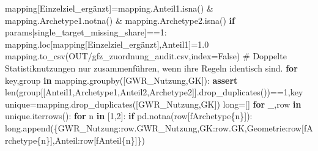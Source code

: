 \documentclass[
  ngerman,
  a4paper,
  DIV=11]{scrreprt}
\newenvironment{Shaded}{\begin{snugshade}}{\end{snugshade}}
\newcommand{\BuiltInTok}[1]{\textcolor[rgb]{0.00,0.23,0.31}{#1}}
\newcommand{\CommentTok}[1]{\textcolor[rgb]{0.37,0.37,0.37}{#1}}
\newcommand{\ControlFlowTok}[1]{\textcolor[rgb]{0.00,0.23,0.31}{\textbf{#1}}}
\newcommand{\DecValTok}[1]{\textcolor[rgb]{0.68,0.00,0.00}{#1}}
\newcommand{\FloatTok}[1]{\textcolor[rgb]{0.68,0.00,0.00}{#1}}
\newcommand{\KeywordTok}[1]{\textcolor[rgb]{0.00,0.23,0.31}{\textbf{#1}}}
\newcommand{\NormalTok}[1]{\textcolor[rgb]{0.00,0.23,0.31}{#1}}
\newcommand{\OperatorTok}[1]{\textcolor[rgb]{0.37,0.37,0.37}{#1}}
\newcommand{\SpecialCharTok}[1]{\textcolor[rgb]{0.37,0.37,0.37}{#1}}
\newcommand{\SpecialStringTok}[1]{\textcolor[rgb]{0.13,0.47,0.30}{#1}}
\newcommand{\StringTok}[1]{\textcolor[rgb]{0.13,0.47,0.30}{#1}}
\newcommand{\VariableTok}[1]{\textcolor[rgb]{0.07,0.07,0.07}{#1}}
\begin{document}
\begin{Shaded}
\begin{Highlighting}[]
\NormalTok{mapping[}\StringTok{\textquotesingle{}Einzelziel\_ergänzt\textquotesingle{}}\NormalTok{]}\OperatorTok{=}\NormalTok{mapping.Anteil1.isna() }\OperatorTok{\&}\NormalTok{ mapping.Archetype1.notna() }\OperatorTok{\&}\NormalTok{ mapping.Archetype2.isna()}
\ControlFlowTok{if}\NormalTok{ params[}\StringTok{\textquotesingle{}single\_target\_missing\_share\textquotesingle{}}\NormalTok{]}\OperatorTok{==}\DecValTok{1}\NormalTok{:}
\NormalTok{    mapping.loc[mapping[}\StringTok{\textquotesingle{}Einzelziel\_ergänzt\textquotesingle{}}\NormalTok{],}\StringTok{\textquotesingle{}Anteil1\textquotesingle{}}\NormalTok{]}\OperatorTok{=}\FloatTok{1.0}
\NormalTok{mapping.to\_csv(OUT}\OperatorTok{/}\StringTok{\textquotesingle{}gfz\_zuordnung\_audit.csv\textquotesingle{}}\NormalTok{,index}\OperatorTok{=}\VariableTok{False}\NormalTok{)}
\CommentTok{\# Doppelte Statistiknutzungen nur zusammenführen, wenn ihre Regeln identisch sind.}
\ControlFlowTok{for}\NormalTok{ key,group }\KeywordTok{in}\NormalTok{ mapping.groupby([}\StringTok{\textquotesingle{}GWR\_Nutzung\textquotesingle{}}\NormalTok{,}\StringTok{\textquotesingle{}GK\textquotesingle{}}\NormalTok{]):}
    \ControlFlowTok{assert} \BuiltInTok{len}\NormalTok{(group[[}\StringTok{\textquotesingle{}Anteil1\textquotesingle{}}\NormalTok{,}\StringTok{\textquotesingle{}Archetype1\textquotesingle{}}\NormalTok{,}\StringTok{\textquotesingle{}Anteil2\textquotesingle{}}\NormalTok{,}\StringTok{\textquotesingle{}Archetype2\textquotesingle{}}\NormalTok{]].drop\_duplicates())}\OperatorTok{==}\DecValTok{1}\NormalTok{,key}
\NormalTok{unique}\OperatorTok{=}\NormalTok{mapping.drop\_duplicates([}\StringTok{\textquotesingle{}GWR\_Nutzung\textquotesingle{}}\NormalTok{,}\StringTok{\textquotesingle{}GK\textquotesingle{}}\NormalTok{])}
\BuiltInTok{long}\OperatorTok{=}\NormalTok{[]}
\ControlFlowTok{for}\NormalTok{ \_,row }\KeywordTok{in}\NormalTok{ unique.iterrows():}
    \ControlFlowTok{for}\NormalTok{ n }\KeywordTok{in}\NormalTok{ [}\DecValTok{1}\NormalTok{,}\DecValTok{2}\NormalTok{]:}
        \ControlFlowTok{if}\NormalTok{ pd.notna(row[}\SpecialStringTok{f\textquotesingle{}Archetype}\SpecialCharTok{\{}\NormalTok{n}\SpecialCharTok{\}}\SpecialStringTok{\textquotesingle{}}\NormalTok{]):}
            \BuiltInTok{long}\NormalTok{.append(\{}\StringTok{\textquotesingle{}GWR\_Nutzung\textquotesingle{}}\NormalTok{:row.GWR\_Nutzung,}\StringTok{\textquotesingle{}GK\textquotesingle{}}\NormalTok{:row.GK,}\StringTok{\textquotesingle{}Geometrie\textquotesingle{}}\NormalTok{:row[}\SpecialStringTok{f\textquotesingle{}Archetype}\SpecialCharTok{\{}\NormalTok{n}\SpecialCharTok{\}}\SpecialStringTok{\textquotesingle{}}\NormalTok{],}\StringTok{\textquotesingle{}Anteil\textquotesingle{}}\NormalTok{:row[}\SpecialStringTok{f\textquotesingle{}Anteil}\SpecialCharTok{\{}\NormalTok{n}\SpecialCharTok{\}}\SpecialStringTok{\textquotesingle{}}\NormalTok{]\})}

\end{Highlighting}
\end{Shaded}
\end{document}
